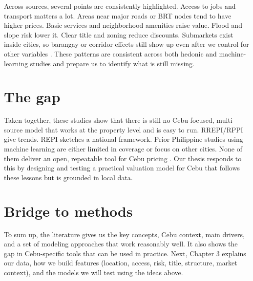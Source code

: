 Across sources, several points are consistently highlighted. Access to jobs and transport matters a lot. Areas near major roads or BRT nodes tend to have higher prices. Basic services and neighborhood amenities raise value. Flood and slope risk lower it. Clear title and zoning reduce discounts. Submarkets exist inside cities, so barangay or corridor effects still show up even after we control for other variables \parencite{agosto2017, bsp2025}. These patterns are consistent across both hedonic and machine-learning studies and prepare us to identify what is still missing.

\section{The gap}

Taken together, these studies show that there is still no Cebu-focused, multi-source model that works at the property level and is easy to run. RREPI/RPPI give trends. REPI sketches a national framework. Prior Philippine studies using machine learning are either limited in coverage or focus on other cities. None of them deliver an open, repeatable tool for Cebu pricing \parencite{bsp2025, domingo2005}. Our thesis responds to this by designing and testing a practical valuation model for Cebu that follows these lessons but is grounded in local data.

\section{Bridge to methods}

To sum up, the literature gives us the key concepts, Cebu context, main drivers, and a set of modeling approaches that work reasonably well. It also shows the gap in Cebu-specific tools that can be used in practice. Next, Chapter 3 explains our data, how we build features (location, access, risk, title, structure, market context), and the models we will test using the ideas above.
